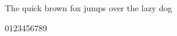 \documentclass{article}
\begin{document}
The quick brown fox jumps over the lazy dog
\par
0123456789
\end{document}
